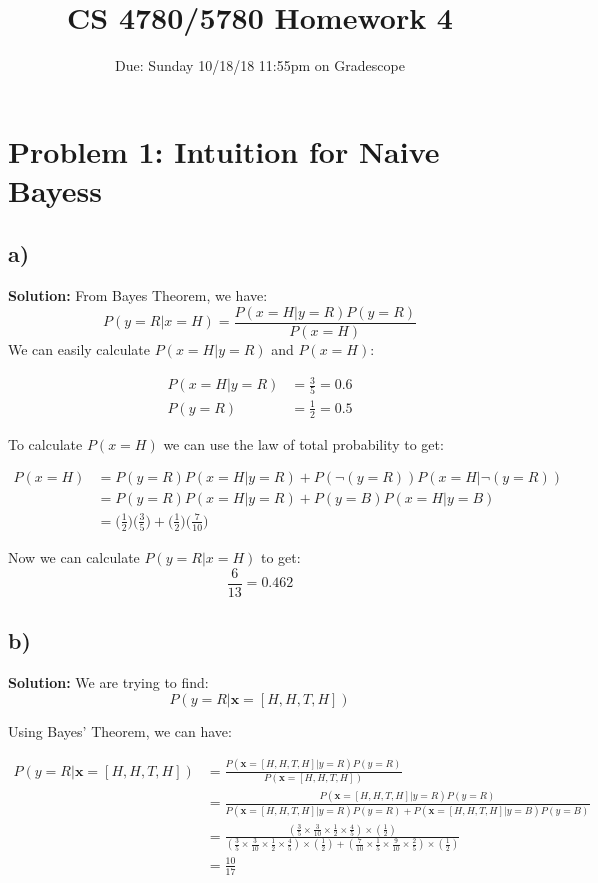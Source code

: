 \documentclass[a4paper]{article}
\title{CS 4780/5780 Homework 4\vspace{-10pt}}
\author{Due: Sunday 10/18/18 11:55pm on Gradescope}
\date{\vspace{-20pt}}
\begin{document}
\maketitle

\section*{Problem 1: Intuition for Naive Bayess}



\subsection*{a)}

\textbf{Solution:}
From Bayes Theorem, we have: $${P(y = R|x = H)} = \frac{P(x = H|y = R)P(y = R)}{P(x = H)}$$We can easily calculate $P(x = H|y = R)$ and $P(x = H)$: 

\begin{align*}
P(x = H|y = R) &= \frac{3}{5}  = 0.6\\
P(y = R) &= \frac{1}{2} = 0.5
\end{align*}

To calculate $P(x = H)$ we can use the law of total probability to get:

\begin{align*}
P(x = H) &= P(y = R)P(x = H|y = R) + P(\neg (y = R))P(x = H|\neg (y = R))\\
&= P(y = R)P(x = H|y = R) + P(y = B)P(x = H|y = B)\\ 
&= \Big(\frac{1}{2}\Big)\Big(\frac{3}{5}\Big) + \Big(\frac{1}{2}\Big)\Big(\frac{7}{10}\Big)
\end{align*}


Now we can calculate $P(y = R|x = H)$ to get: $$ \frac{6}{13} = 0.462$$

\subsection*{b)}


\textbf{Solution:}
We are trying to find: 
$$P(y = R | \textbf{x} = [H,H,T,H])$$

Using Bayes' Theorem, we can have: 

\begin{align*}
     P(y = R|\textbf{x} = [H,H,T,H]) &= \frac{P(\textbf{x} = [H,H,T,H] | y = R) P(y=R)}{P(\textbf{x} = [H,H,T,H])} \\
     &= \frac{P(\textbf{x} = [H,H,T,H] | y = R) P(y=R)}{P(\textbf{x} = [H,H,T,H] | y = R) P(y=R) + P(\textbf{x} = [H,H,T,H] | y = B) P(y=B)} \\
     &= \frac{(\frac{3}{5} \times \frac{3}{10} \times \frac{1}{2} \times \frac{4}{5}) \times (\frac{1}{2})}{(\frac{3}{5} \times \frac{3}{10} \times \frac{1}{2} \times \frac{4}{5})  \times (\frac{1}{2}) + (\frac{7}{10} \times \frac{1}{5}
     \times \frac{9}{10} \times \frac{2}{5})  \times (\frac{1}{2}) } \\
     &= \frac{10}{17}
\end{align*}
\end{document}
